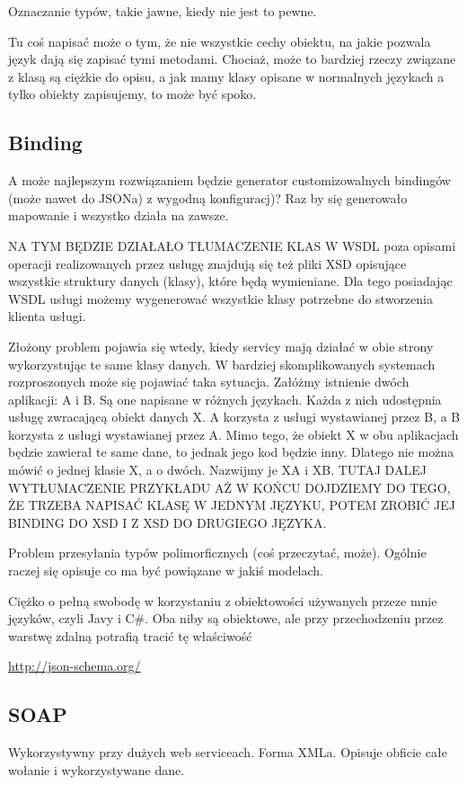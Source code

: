Oznaczanie typów, takie jawne, kiedy nie jest to pewne.

Tu coś napisać może o tym, że nie wszystkie cechy obiektu, na jakie pozwala język dają się zapisać tymi metodami. Chociaż, może to bardziej rzeczy związane z klasą są ciężkie do opisu, a jak mamy klasy opisane w normalnych językach a tylko obiekty zapisujemy, to może być spoko.

\subsection{Binding}
A może najlepszym rozwiązaniem będzie generator customizowalnych bindingów (może nawet do JSONa) z wygodną konfiguracj)? Raz by się generowało mapowanie i wszystko działa na zawsze. 

NA TYM BĘDZIE DZIAŁAŁO TŁUMACZENIE KLAS
W WSDL poza opisami operacji realizowanych przez usługę znajdują się też pliki XSD opisujące wszystkie struktury danych (klasy), które będą wymieniane. Dla tego posiadając WSDL usługi możemy wygenerować wszystkie klasy potrzebne do stworzenia klienta usługi.

Złożony problem pojawia się wtedy, kiedy servicy mają działać w obie strony wykorzystując te same klasy danych. W bardziej skomplikowanych systemach rozproszonych może się pojawiać taka sytuacja. Załóżmy istnienie dwóch aplikacji: A i B. Są one napisane w różnych językach. Każda z nich udostępnia usługę zwracającą obiekt danych X. A korzysta z usługi wystawianej przez B, a B korzysta z usługi wystawianej przez A. Mimo tego, że obiekt X w obu aplikacjach będzie zawierał te same dane, to jednak jego kod będzie inny. Dlatego nie można mówić o jednej klasie X, a o dwóch. Nazwijmy je XA i XB. TUTAJ DALEJ WYTŁUMACZENIE PRZYKŁADU AŻ W KOŃCU DOJDZIEMY DO TEGO, ŻE TRZEBA NAPISAĆ KLASĘ W JEDNYM JĘZYKU, POTEM ZROBIĆ JEJ BINDING DO XSD I Z XSD DO DRUGIEGO JĘZYKA.

Problem przesyłania typów polimorficznych (coś przeczytać, może). Ogólnie raczej się opisuje co ma być powiązane w jakiś modelach.

Ciężko o pełną swobodę w korzystaniu z obiektowości używanych przeze mnie języków, czyli Javy i C\#. Oba niby są obiektowe, ale przy przechodzeniu przez warstwę zdalną potrafią tracić tę właściwość

\url{http://json-schema.org/}\\

\subsection{SOAP}
Wykorzystywny przy dużych web serviceach. Forma XMLa. Opisuje obficie całe wołanie i wykorzystywane dane.

